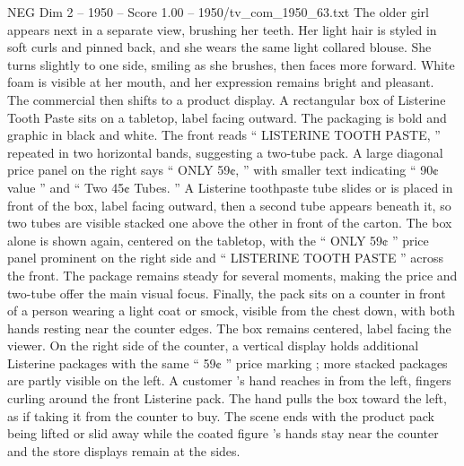 \begin{textsample}{NEG Dim 2 – 1950 – Score 1.00 – 1950/tv\_com\_1950\_63.txt}
The older girl appears next in a separate view, brushing her teeth.
Her light hair is styled in soft curls and pinned back, and she wears the same light collared blouse.
She turns slightly to one side, smiling as she brushes, then faces more forward.
White foam is visible at her mouth, and her expression remains bright and pleasant.
The commercial then shifts to a product display.
A rectangular box of Listerine Tooth Paste sits on a tabletop, label facing outward.
The packaging is bold and graphic in black and white.
The front reads “ LISTERINE TOOTH PASTE, ” repeated in two horizontal bands, suggesting a two-tube pack.
A large diagonal price panel on the right says “ ONLY 59¢, ” with smaller text indicating “ 90¢ value ” and “ Two 45¢ Tubes. ” A Listerine toothpaste tube slides or is placed in front of the box, label facing outward, then a second tube appears beneath it, so two tubes are visible stacked one above the other in front of the carton.
The box alone is shown again, centered on the tabletop, with the “ ONLY 59¢ ” price panel prominent on the right side and “ LISTERINE TOOTH PASTE ” across the front.
The package remains steady for several moments, making the price and two-tube offer the main visual focus.
Finally, the pack sits on a counter in front of a person wearing a light coat or smock, visible from the chest down, with both hands resting near the counter edges.
The box remains centered, label facing the viewer.
On the right side of the counter, a vertical display holds additional Listerine packages with the same “ 59¢ ” price marking ; more stacked packages are partly visible on the left.
A customer ’s hand reaches in from the left, fingers curling around the front Listerine pack.
The hand pulls the box toward the left, as if taking it from the counter to buy.
The scene ends with the product pack being lifted or slid away while the coated figure ’s hands stay near the counter and the store displays remain at the sides.

\end{textsample}
